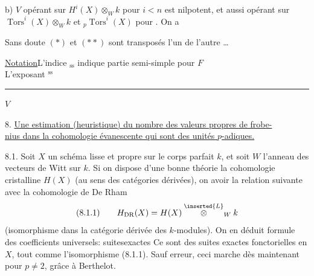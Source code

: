  b) $V$ opérant sur $H^i(X)\otimes_W k$ pour $i<n$ est nilpotent, et aussi opérant sur $\operatorname{Tors}^i(X)\otimes_W k$ et ${}_p\operatorname{Tors}^i(X)$ pour . On a
\margin{$(**)$}

Sans doute $(*)$ et $(**)$ sont transposés l'un de l'autre \ldots

\uline{Notation}\quad L'indice ${}_{\mathrm{ss}}$ indique partie semi-simple pour $F$\\
L'exposant ${}^{\mathrm{ss}}$ \rule{7cm}{.3pt} $V$


8. \uline{Une estimation (heuristique) du nombre des valeurs propres de frobe-}\\
\uline{nius dans la cohomologie évanescente qui sont des unités $p$-adiques.}

8.1. Soit $X$ un schéma lisse et propre sur le corps parfait $k$,  et soit $W$ l'anneau des vecteurs de Witt sur $k$. Si on dispose d'une bonne théorie  la cohomologie cristalline $H(X)$ (au sens des catégories dérivées), on  avoir la relation suivante avec la cohomologie de De Rham
\[
(8.1.1)\qquad H_{\mathrm{DR}}(X)=H(X)\overset{\inserted{L}}{\otimes}_W k
\]
(isomorphisme dans la catégorie dérivée des $k$-modules). On en déduit  formule des coefficients universels: suitesexactes
Ce sont des suites exactes fonctorielles en $X$, tout comme l'isomorphisme (8.1.1). Sauf erreur,  ceci marche dès maintenant pour $p\ne2$, grâce à Berthelot.

